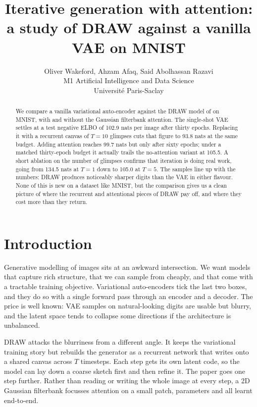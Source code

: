 \documentclass{article}
\title{Iterative generation with attention: \\ a study of DRAW against a vanilla VAE on MNIST}
\author{Oliver Wakeford, Ahzam Afaq, Said Abolhassan Razavi \\
M1 Artificial Intelligence and Data Science \\
Universit\'e Paris-Saclay}
\newcommand{\vaeNelbo}{102.9}
\newcommand{\drawNoAttnNelbo}{93.8}
\newcommand{\drawAttnNelbo}{99.7}            %
\newcommand{\drawAttnNelboShort}{105.5}      %
\newcommand{\drawTOneNelbo}{134.5}
\newcommand{\drawTFiveNelbo}{105.0}
\begin{document}
\maketitle

\begin{abstract}
We compare a vanilla variational auto-encoder against the DRAW model of
\citet{gregor2015draw} on MNIST, with and without the Gaussian filterbank
attention. The single-shot VAE settles at a test negative ELBO of \vaeNelbo{}
nats per image after thirty epochs. Replacing it with a recurrent canvas of
\(T=10\) glimpses cuts that figure to \drawNoAttnNelbo{} nats at the same
budget. Adding attention reaches \drawAttnNelbo{} nats but only after sixty
epochs; under a matched thirty-epoch budget it actually trails the
no-attention variant at \drawAttnNelboShort{}. A short ablation on the number
of glimpses confirms that iteration is doing real work, going from
\drawTOneNelbo{} nats at \(T=1\) down to \drawTFiveNelbo{} at \(T=5\). The
samples line up with the numbers: DRAW produces noticeably sharper digits
than the VAE in either flavour. None of this is new on a dataset like MNIST,
but the comparison gives us a clean picture of where the recurrent and
attentional pieces of DRAW pay off, and where they cost more than they
return.
\end{abstract}

\section{Introduction}
\label{sec:intro}

Generative modelling of images sits at an awkward intersection. We want
models that capture rich structure, that we can sample from cheaply, and that
come with a tractable training objective. Variational auto-encoders
\citep{kingma2014vae,rezende2014stochastic} tick the last two boxes, and they
do so with a single forward pass through an encoder and a decoder. The price
is well known: VAE samples on natural-looking digits are usable but blurry,
and the latent space tends to collapse some directions if the architecture is
unbalanced.

DRAW \citep{gregor2015draw} attacks the blurriness from a different angle. It
keeps the variational training story but rebuilds the generator as a recurrent
network that writes onto a shared canvas across \(T\) timesteps. Each step
gets its own latent code, so the model can lay down a coarse sketch first and
then refine it. The paper goes one step further. Rather than reading or
writing the whole image at every step, a 2D Gaussian filterbank focusses
attention on a small patch, parameters and all learnt end-to-end.
\end{document}
